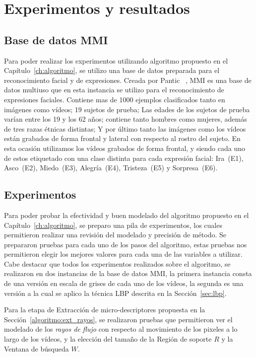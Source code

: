 \chapter[Experimentos y resultados]{Experimentos y resultados}
\label{ch:exp_result}

\section{Base de datos MMI}
\label{exp:bdd}
Para poder realizar los experimentos utilizando algoritmo propuesto en el Capítulo~\ref{ch:algoritmo}, se utilizo una base de datos preparada para el reconocimiento facial y de expresiones. Creada por Pantic \etal~\cite{Pantic2005}, MMI es una base de datos multiuso que en esta instancia se utilizo para el reconocimiento de expresiones faciales. Contiene mas de 1000 ejemplos clasificados tanto en imágenes como vídeos; 19 sujetos de prueba; Las edades de los sujetos de prueba varían entre los 19 y los 62 años;  contiene tanto hombres como mujeres, además de tres razas étnicas distintas; Y por último tanto las imágenes como los vídeos están grabados de forma frontal y lateral con respecto al rostro del sujeto. En esta ocasión utilizamos los vídeos grabados de forma frontal, y siendo cada uno de estos etiquetado con una clase distinta para cada expresión facial: Ira~(E1), Asco~(E2), Miedo~(E3), Alegría~(E4), Tristeza~(E5) y Sorpresa~(E6).

\section{Experimentos}
\label{exp:exp}

Para poder probar la efectividad y buen modelado del algoritmo propuesto en el Capítulo~\ref{ch:algoritmo}, se preparo una pila de experimentos, los cuales permitieron realizar una revisión del modelado y precisión de método.
Se prepararon pruebas para cada uno de los pasos del algoritmo, estas pruebas nos permitieron elegir los mejores valores para cada una de las variables a utilizar. Cabe destacar que todos los experimentos realizados sobre el algoritmo, se realizaron en dos instancias de la base de datos MMI, la primera instancia consta de una versión en escala de grises de cada uno de los vídeos, la segunda es una versión a la cual se aplico la técnica LBP descrita en la Sección~\ref{sec:lbp}.

Para la etapa de Extracción de micro-descriptores propuesta en la Sección~\ref{algoritmo:ext_rayos}, se realizaron pruebas que permitieron ver el modelado de los \textit{rayos de flujo} con respecto al movimiento de los pixeles a lo largo de los vídeos, y la elección del tamaño de la Región de soporte $R$ y la Ventana de búsqueda $W$.

